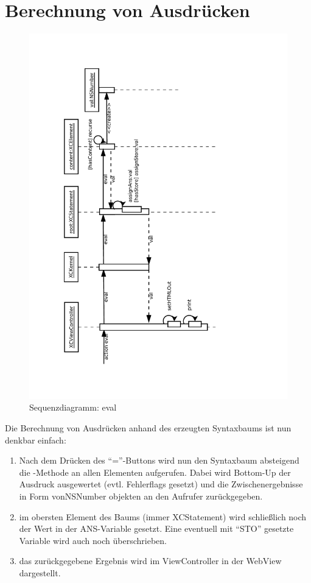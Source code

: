 \section{Berechnung von Ausdrücken}
\begin{figure}[H]
	\centering
	\label{dia:sq:eval}
	\includegraphics[angle=270, width=1\textwidth]{sq_eval.pdf}
	\caption{Sequenzdiagramm: eval}
\end{figure}
Die Berechnung von Ausdrücken anhand des erzeugten Syntaxbaums ist nun denkbar einfach:
\begin{enumerate}
	\item Nach dem Drücken des ``=''-Buttons wird nun den Syntaxbaum absteigend die -Methode an allen Elementen aufgerufen. 
		Dabei wird Bottom-Up der Ausdruck ausgewertet (evtl. Fehlerflags gesetzt) und die Zwischenergebnisse in Form vonNSNumber objekten an den Aufrufer zurückgegeben.
	\item im obersten Element des Baums (immer XCStatement) wird schließlich noch der Wert in der ANS-Variable gesetzt. Eine eventuell mit ``STO'' gesetzte Variable wird auch noch überschrieben.
	\item das zurückgegebene Ergebnis wird im ViewController in der WebView dargestellt.
\end{enumerate}

